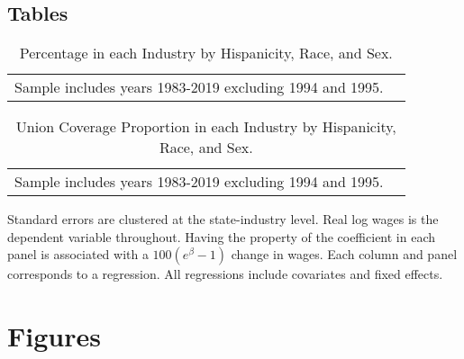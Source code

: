 \documentclass[11pt]{article}
\begin{document}
\singlespacing
\pagebreak

\nocite{*}


\pagebreak
\appendix
\begin{landscape}
\section*{Tables}
\small{}
\end{landscape}
\pagebreak
\begin{landscape}
\small{\begin{table}[h!]
    \centering
    \caption{Percentage in each Industry by Hispanicity, Race, and Sex.}\label{tab:nindtab}
\begin{tabular}{l*{8}{c}}

\hline\hline
\multicolumn{8}{l}{\footnotesize Sample includes years 1983-2019 excluding 1994 and 1995.}\\
\end{tabular}
\end{table}}
\end{landscape}
\pagebreak
\begin{landscape}
\small{\begin{table}[h!]
    \centering
    \caption{Union Coverage Proportion in each Industry by Hispanicity, Race, and Sex.}\label{tab:unindtab}
\begin{tabular}{l*{8}{c}}

\hline\hline
\multicolumn{8}{l}{\footnotesize Sample includes years 1983-2019 excluding 1994 and 1995.}\\
\end{tabular}
\end{table}}
\end{landscape}
\pagebreak
\small{}
\footnotesize{Standard errors are clustered at the state-industry level. Real log wages is the dependent variable throughout. Having the property of the coefficient in each panel is associated with a $ 100(e^\beta - 1) $ change in wages. Each column and panel corresponds to a regression. All regressions include covariates and fixed effects.}
\pagebreak

\pagebreak
\section*{Figures}
\pagebreak
\end{document}

